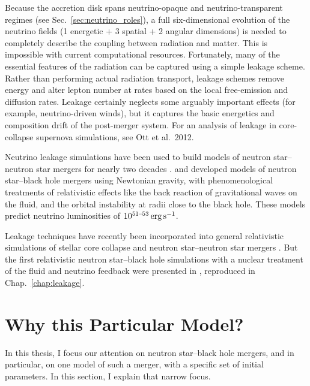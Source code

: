 Because the accretion disk spans neutrino-opaque and neutrino-transparent regimes
(see Sec.~\ref{sec:neutrino_roles}), a full six-dimensional evolution of the
neutrino fields (1 energetic + 3 spatial + 2 angular dimensions) is needed
to completely describe the coupling between radiation and matter.
This is impossible with current computational resources. Fortunately, many of
the essential features of the radiation can be captured using a simple
leakage scheme. Rather than performing actual radiation transport, leakage
schemes remove energy and alter lepton number at rates based on the local
free-emission and diffusion rates. Leakage certainly neglects some arguably
important effects (for example, neutrino-driven winds), but it captures
the basic energetics and composition drift of the post-merger system.
For an analysis of leakage in core-collapse supernova simulations,
see Ott et al.\ 2012.

Neutrino leakage simulations have been used to build models of neutron
star--neutron star \nsns mergers for nearly two decades
\citep{
ruff1996-leakage_part1,
ruff1997-leakage_part2,
ross2002-leakage_part1,
ross2003-leakage_part2}.
\citet{jank1999-leakage_bhns} and \citet{ross2004-leakage_bhns} developed models
of neutron star--black hole \nsbh mergers using Newtonian gravity, with
phenomenological treatments of relativistic effects like the back reaction of
gravitational waves on the fluid, and the orbital instability at radii close to
the black hole.
These models predict neutrino luminosities of $10^{51\text{--}53}\rm\,erg\,s^{-1}$.

Leakage techniques have recently been incorporated into general relativistic
simulations of stellar core collapse \citep{2011ApJ...737....6S, Ott:2012mr} and
neutron star--neutron star \nsns mergers \citep{Sekiguchi:2011zd,Kiuchi:2012mk}. 
But the first relativistic neutron star--black hole simulations with a
nuclear treatment of the fluid and neutrino feedback were presented in
\cite{deat2013-leakage}, reproduced in Chap.~\ref{chap:leakage}.

\section{Why this Particular Model?}
\label{sec:why_this_model}
In this thesis, I focus our attention on neutron star--black hole mergers, and in
particular, on one model of such a merger, with a specific set of initial
parameters. In this section, I explain that narrow focus.


